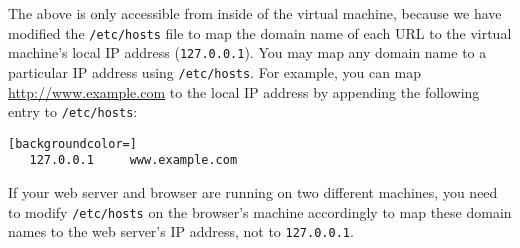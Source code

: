 
The above \urlisorurlsare is only accessible from inside of the virtual machine, because we
have modified the \texttt{/etc/hosts} file to map the domain
name of each URL to the virtual machine's local IP
address ({\tt 127.0.0.1}).
You may map any domain name to a particular IP address using
\texttt{/etc/hosts}. For example, you can map
\url{http://www.example.com} to the local IP address by appending the
following entry to \texttt{/etc/hosts}:

\begin{lstlisting}[backgroundcolor=]
   127.0.0.1     www.example.com
\end{lstlisting}

If your web server and browser are running on two different machines, you need
to modify \texttt{/etc/hosts} on the browser's machine accordingly to map these
domain names to the web server's IP address, not to {\tt 127.0.0.1}.


